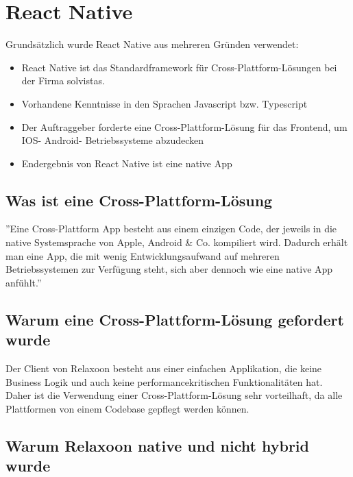 
\section{React Native}

Grundsätzlich wurde React Native aus mehreren Gründen verwendet:
\begin{itemize}
    \item React Native ist das Standardframework für Cross-Plattform-Lösungen bei der Firma solvistas.
    \item Vorhandene Kenntnisse in den Sprachen Javascript bzw. Typescript
    \item Der Auftraggeber forderte eine Cross-Plattform-Lösung für das Frontend, um IOS- Android- Betriebssysteme abzudecken
    \item Endergebnis von React Native ist eine native App
\end{itemize}




\subsection{Was ist eine Cross-Plattform-Lösung}

''Eine Cross-Plattform App besteht aus einem einzigen Code,
der jeweils in die native Systemsprache von Apple, Android \& Co. kompiliert wird.
Dadurch erhält man eine App, die mit wenig Entwicklungsaufwand auf mehreren
Betriebssystemen zur Verfügung steht, sich aber dennoch wie eine native App
anfühlt.''
\cite{cross-plattform}




\subsection{Warum  eine Cross-Plattform-Lösung gefordert wurde}
Der Client von Relaxoon besteht aus einer einfachen Applikation, die keine Business Logik
und auch keine performancekritischen Funktionalitäten hat.
Daher ist die Verwendung einer Cross-Plattform-Lösung sehr vorteilhaft,
da alle Plattformen von einem Codebase gepflegt werden können.



\subsection{Warum Relaxoon native und nicht hybrid wurde}


